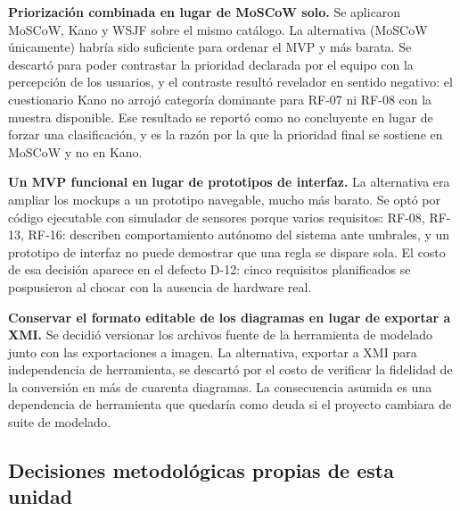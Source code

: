 \textbf{Priorizaci\'on combinada en lugar de MoSCoW solo.} Se aplicaron MoSCoW, Kano y WSJF sobre el mismo cat\'alogo. La alternativa (MoSCoW \'unicamente) habr\'ia sido suficiente para ordenar el MVP y m\'as barata. Se descart\'o para poder contrastar la prioridad declarada por el equipo con la percepci\'on de los usuarios, y el contraste result\'o revelador en sentido negativo: el cuestionario Kano no arroj\'o categor\'ia dominante para RF-07 ni RF-08 con la muestra disponible. Ese resultado se report\'o como no concluyente en lugar de forzar una clasificaci\'on, y es la raz\'on por la que la prioridad final se sostiene en MoSCoW y no en Kano.

\textbf{Un MVP funcional en lugar de prototipos de interfaz.} La alternativa era ampliar los mockups a un prototipo navegable, mucho m\'as barato. Se opt\'o por c\'odigo ejecutable con simulador de sensores porque varios requisitos: RF-08, RF-13, RF-16: describen comportamiento aut\'onomo del sistema ante umbrales, y un prototipo de interfaz no puede demostrar que una regla se dispare sola. El costo de esa decisi\'on aparece en el defecto D-12: cinco requisitos planificados se pospusieron al chocar con la ausencia de hardware real.

\textbf{Conservar el formato editable de los diagramas en lugar de exportar a XMI.} Se decidi\'o versionar los archivos fuente de la herramienta de modelado junto con las exportaciones a imagen. La alternativa, exportar a XMI para independencia de herramienta, se descart\'o por el costo de verificar la fidelidad de la conversi\'on en m\'as de cuarenta diagramas. La consecuencia asumida es una dependencia de herramienta que quedar\'ia como deuda si el proyecto cambiara de suite de modelado.

\subsection{Decisiones metodol\'ogicas propias de esta unidad}

